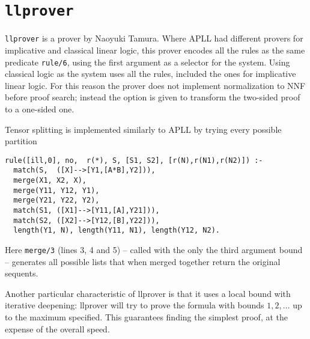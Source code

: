 \section{\texttt{llprover}}
\texttt{llprover} is a prover by Naoyuki Tamura.
Where APLL had different provers for implicative and classical linear logic, this prover encodes all the rules as the same predicate \texttt{rule/6}, using the first argument as a selector for the system.
Using classical logic as the system uses all the rules, included the ones for implicative linear logic.
For this reason the prover does not implement normalization to NNF before proof search; instead the option is given to transform the two-sided proof to a one-sided one.

Tensor splitting is implemented similarly to APLL by trying every possible partition
\begin{verbatim}
rule([ill,0], no,  r(*), S, [S1, S2], [r(N),r(N1),r(N2)]) :-
  match(S,  ([X]-->[Y1,[A*B],Y2])),
  merge(X1, X2, X),
  merge(Y11, Y12, Y1),
  merge(Y21, Y22, Y2),
  match(S1, ([X1]-->[Y11,[A],Y21])),
  match(S2, ([X2]-->[Y12,[B],Y22])),
  length(Y1, N), length(Y11, N1), length(Y12, N2).
\end{verbatim}
Here \texttt{merge/3} (lines 3, 4 and 5) -- called with the only the third argument bound -- generates all possible lists that when merged together return the original sequents.

Another particular characteristic of llprover is that it uses a local bound with iterative deepening: llprover will try to prove the formula with bounds $1, 2, \dots$ up to the maximum specified.
This guarantees finding the simplest proof, at the expense of the overall speed.

